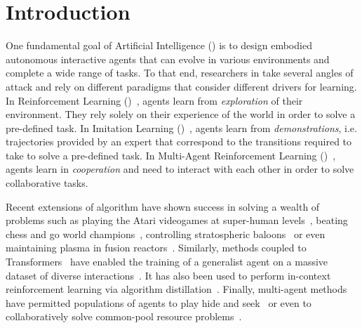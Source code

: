 
\chapter{Introduction}


\minitoc

One fundamental goal of Artificial Intelligence (\ai) is to design embodied autonomous interactive agents that can evolve in various environments and complete a wide range of tasks. To that end, researchers in \ai take several angles of attack and rely on different paradigms that consider different drivers for learning. In Reinforcement Learning (\rl)~\citep{sutton2018reinforcement}, agents learn from \textit{exploration} of their environment. They rely solely on their experience of the world in order to solve a pre-defined task. In Imitation Learning (\il)~\citep{pomerleau1991efficient}, agents learn from \textit{demonstrations}, i.e. trajectories provided by an expert that correspond to the transitions required to take to solve a pre-defined task.  In Multi-Agent Reinforcement Learning (\marl)~\citep{LITTMAN1994157}, agents learn in \textit{cooperation} and need to interact with each other in order to solve collaborative tasks.


Recent extensions of \rl algorithm have shown success in solving a wealth of problems such as playing the Atari videogames at super-human levels~\citep{mnih2015human}, beating chess and go world champions~\citep{silver2016mastering}, controlling stratospheric baloons~\citep{bellemare2020autonomous} or even maintaining plasma in fusion reactors~\citep{degrave2022magnetic}. Similarly, \il methods coupled to Transformers~\citep{vaswani2017attention} have enabled the training of a generalist agent on a massive dataset of diverse interactions~\citep{reed2022a}. It has also been used to perform in-context reinforcement learning via algorithm distillation~\citep{laskin2022incontext}. Finally, multi-agent methods have permitted populations of agents to play hide and seek~\citep{Baker2020Emergent} or even to collaboratively solve common-pool resource problems~\citep{perolat2017commonpool}.

